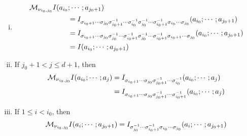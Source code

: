 \begin{theorem}\label{thm: monodromy on iterated integrals II}\hfill
\begin{enumerate}[i.]
\item 
\begin{equation}\label{eq: M_{i0,j0}I(a_{i0};...;a_{j0+1})}
\begin{aligned}
\mathcal M_{\nu_{i_0,j_0}}I(a_{i_0}&;\cdots;a_{j_0+1})\\
&=I_{\sigma_{i_0+1}\cdots\sigma_{j_0}\sigma_{j_0+1}^{-1}\cdots\sigma_{i_0}^{-1}\sigma_{j_0}^{-1}\cdots\sigma_{i_0+1}^{-1}\sigma_{i_0}\cdots\sigma_{j_0}}(a_{i_0};\cdots;a_{j_0+1})\\
&=I_{\sigma_{i_0+1}\cdots\sigma_{j_0}\sigma_{j_0}^{-1}\cdots\sigma_{i_0+1}^{-1}\sigma_{j_0}^{-1}\cdots\sigma_{i_0+1}^{-1}\sigma_{i_0+1}\cdots\sigma_{j_0}}(a_{i_0};\cdots;a_{j_0+1})\\
&=I(a_{i_0};\cdots;a_{j_0+1})
\end{aligned}
\end{equation}
\item If $j_0+1<j\leq d+1$, then
\begin{equation}\label{eq: M_{i0,j0}I(a_{i0};...;a_j)}
\begin{aligned}
\mathcal M_{\nu_{i_0,j_0}}I(a_{i_0};\cdots;a_j)&=I_{\sigma_{i_0+1}\cdots\sigma_{j_0}\sigma_{j_0+1}^{-1}\cdots\sigma_{i_0}^{-1}}(a_{i_0};\cdots;a_j)\\
&=I_{\sigma_{i_0+1}\cdots\sigma_{j_0}\sigma_{j_0+1}^{-1}\cdots\sigma_{i_0+1}^{-1}}(a_{i_0};\cdots;a_j)\\
\end{aligned}
\end{equation}
\item If $1\leq i<i_0$, then
\begin{equation}\label{eq: M_{i0,j0}I(a_i;...;a_{j0+1})}
\begin{aligned}
\mathcal M_{\nu_{i_0,j_0}}I(a_i;\cdots;a_{j_0+1})&=I_{\sigma_{j_0}^{-1}\cdots\sigma_{i_0+1}^{-1}\sigma_{i_0}\cdots\sigma_{j_0}}(a_i;\cdots;a_{j_0+1})\\
\end{aligned}
\end{equation}

\end{enumerate}
\end{theorem}
